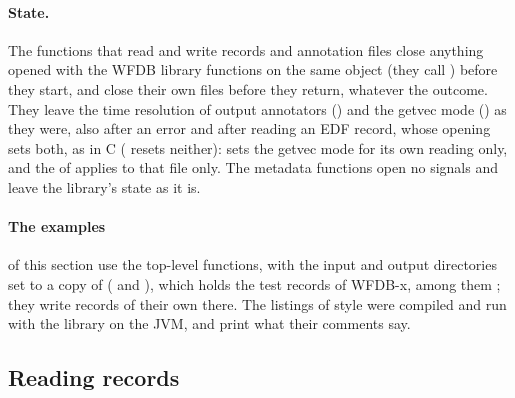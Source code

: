 \paragraph{State.} The functions that read and write records and annotation files close
anything opened with the WFDB library functions on the same  object (they call
) before they start, and close their own files before they return,
whatever the outcome. They leave the time resolution of output annotators
() and the getvec mode () as they were, also after an
error and after reading an EDF record, whose opening sets both, as in C (
resets neither):  sets the getvec mode for its own reading only, and the
 of  applies to that file only. The metadata functions
open no signals and leave the library's state as it is.

\paragraph{The examples} of this section use the top-level functions, with the input and
output directories set to a copy of  ( and
), which holds the test records of WFDB-x, among them
; they write records of their own there. The listings of style 
were compiled and run with the library on the JVM, and print what their comments say.

\subsection{Reading records}
\label{sec:kotlin-reading}

